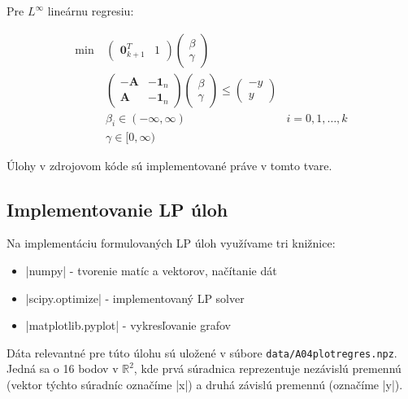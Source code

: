 \documentclass[report.tex]{subfiles}
\begin{document}
Pre $L^{\infty}$ lineárnu regresiu:

\begin{align*}
	\text{min}~ &
	\left(
	\begin{array}{c|c}
		\mathbf{0}_{k+1}^T & 1
	\end{array}
	\right)
	\left(
	\begin{array}{c}
		\beta \\
		\hline
		\gamma
	\end{array}
	\right) \\
	&\left(
	\begin{array}{c|c}
		-\mathbf{A} & -\mathbf{1}_n \\
		\hline
		\mathbf{A} & -\mathbf{1}_n
	\end{array}
	\right)
	\left(
	\begin{array}{c}
		\beta \\
		\hline
		\gamma
	\end{array}
	\right)
	\leq
	\left(
	\begin{array}{c}
		-y \\
		\hline
		y
	\end{array}
	\right) \\
	&\beta_i \in (-\infty, \infty) &i = 0,1,\dots,k\\
	&\gamma \in [0, \infty)
\end{align*}

Úlohy v zdrojovom kóde sú implementované práve v tomto tvare.

\subsection{Implementovanie LP úloh}

Na implementáciu formulovaných LP úloh využívame tri knižnice:

\begin{itemize}
	\item \pyth|numpy| - tvorenie matíc a vektorov, načítanie dát
	\item \pyth|scipy.optimize| - implementovaný LP solver
	\item \pyth|matplotlib.pyplot| - vykresľovanie grafov
\end{itemize}

Dáta relevantné pre túto úlohu sú uložené v súbore \verb|data/A04plotregres.npz|. Jedná sa o 16 bodov v $\mathbb{R}^2$, kde prvá súradnica reprezentuje nezávislú premennú (vektor týchto súradníc označíme \pyth|x|) a druhá závislú premennú (označíme \pyth|y|). 
\end{document}
